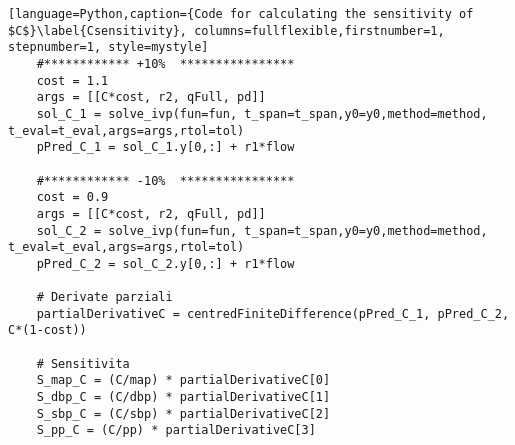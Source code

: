 \begin{lstlisting}[language=Python,caption={Code for calculating the sensitivity of $C$}\label{Csensitivity}, columns=fullflexible,firstnumber=1, stepnumber=1, style=mystyle]
    #************ +10%  ****************
    cost = 1.1
    args = [[C*cost, r2, qFull, pd]]
    sol_C_1 = solve_ivp(fun=fun, t_span=t_span,y0=y0,method=method, t_eval=t_eval,args=args,rtol=tol)
    pPred_C_1 = sol_C_1.y[0,:] + r1*flow
    
    #************ -10%  ****************
    cost = 0.9
    args = [[C*cost, r2, qFull, pd]]
    sol_C_2 = solve_ivp(fun=fun, t_span=t_span,y0=y0,method=method, t_eval=t_eval,args=args,rtol=tol)
    pPred_C_2 = sol_C_2.y[0,:] + r1*flow
    
    # Derivate parziali
    partialDerivativeC = centredFiniteDifference(pPred_C_1, pPred_C_2, C*(1-cost))
    
    # Sensitivita
    S_map_C = (C/map) * partialDerivativeC[0]
    S_dbp_C = (C/dbp) * partialDerivativeC[1]
    S_sbp_C = (C/sbp) * partialDerivativeC[2]
    S_pp_C = (C/pp) * partialDerivativeC[3]
\end{lstlisting}